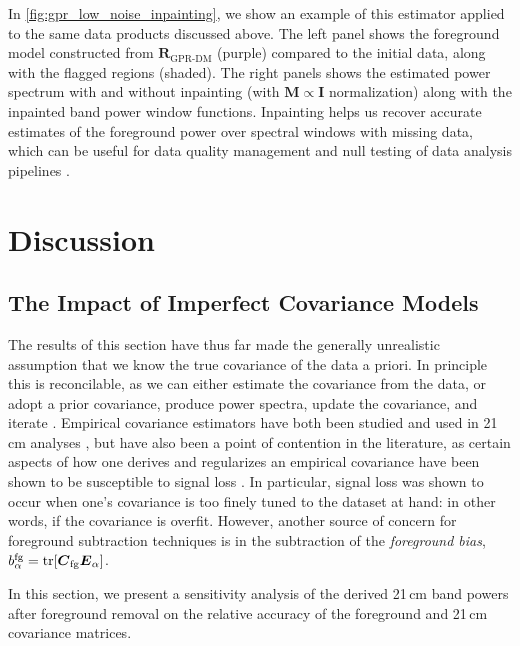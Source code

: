\documentclass[a4paper,fleqn,usenatbib]{mnras}
\def\E{\boldsymbol{E}}
\def\R{\boldsymbol{R}}
\def\M{\boldsymbol{M}}
\def\Cfg{\boldsymbol{C}_{\rm fg}}
\def\I{\boldsymbol{I}}
\def\tr{{\rm tr}}
\begin{document}
In \autoref{fig:gpr_low_noise_inpainting}, we show an example of this estimator applied to the same data products discussed above.
The left panel shows the foreground model constructed from $\R_{\operatorname{GPR-DM}}$ (purple) compared to the initial data, along with the flagged regions (shaded).
The right panels shows the estimated power spectrum with and without inpainting (with $\M\propto\I$ normalization) along with the inpainted band power window functions.
Inpainting helps us recover accurate estimates of the foreground power over spectral windows with missing data, which can be useful for data quality management and null testing of data analysis pipelines \citep{Kolopanis2019}.



\section{Discussion}
\label{sec:discussion}

\subsection{The Impact of Imperfect Covariance Models}
\label{sec:cov_models}

The results of this section have thus far made the generally unrealistic assumption that we know the true covariance of the data a priori.
In principle this is reconcilable, as we can either estimate the covariance from the data, or adopt a prior covariance, produce power spectra, update the covariance, and iterate \citep{Bunn1995, Tegmark, Padmanabhan2001}.
Empirical covariance estimators have both been studied and used in 21\,cm analyses \citep{Dillon2014, Ali2015, Switzer, Eastwood, Masui}, but have also been a point of contention in the literature, as certain aspects of how one derives and regularizes an empirical covariance have been shown to be susceptible to signal loss \citep{Cheng2018}.
In particular, signal loss was shown to occur when one's covariance is too finely tuned to the dataset at hand: in other words, if the covariance is overfit.
However, another source of concern for foreground subtraction techniques is in the subtraction of the \emph{foreground bias}, $b^{\rm fg}_\alpha = \tr[\Cfg\E_\alpha]$.

In this section, we present a sensitivity analysis of the derived 21\,cm band powers after foreground removal on the relative accuracy of the foreground and 21\,cm covariance matrices.
\end{document}
